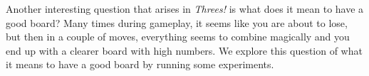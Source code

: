 \documentclass[11pt]{article}
\begin{document}
\begin{comment}
The question remains of whether this score is attainable. We note that this is attainable through the following process. Suppose that the tiles entered the board in the following process:\\
\begin{itemize}
\item At the beginning pieces alternate between $1$ and $2$.
\item First, pieces come in from the bottom left, and we push these to the right. 
\begin{itemize}
\item continue this until you are left with $2, 3, 6, 12$ in the bottom row.
\item we can do this with every row (with last value inserted alternating between 1 and 2), and then go down, inserting alternating 1 and 2 at the top in the first column to get 
\[ \begin{array}{cccc}
2 & & & \\
1 & & & \\
2 & & & \\
6 &12&24&48 \end{array} \]
\end{itemize}
\item We now go down until we fill in the whole board like
\[ \begin{array}{cccc} 
2 & & & \\
3 & & & \\
6 & & & \\
12&24 &48&96\end{array} \]
\item We can do a similar process in the other direction to achieve
\[ \begin{array}{cccc}
12&6 & 3& 2 \\
24& & &  \\
48& & & \\
96 & 192 & 284& 568\end{array} \]
\end{itemize}
\end{comment}

Another interesting question that arises in \emph{Threes!} is what does it mean to have a good board? Many times during gameplay, it seems like you are about to lose, but then in a couple of moves, everything seems to combine magically and you end up with a clearer board with high numbers. We explore this question of what it means to have a good board by running some experiments. 
\end{document}
